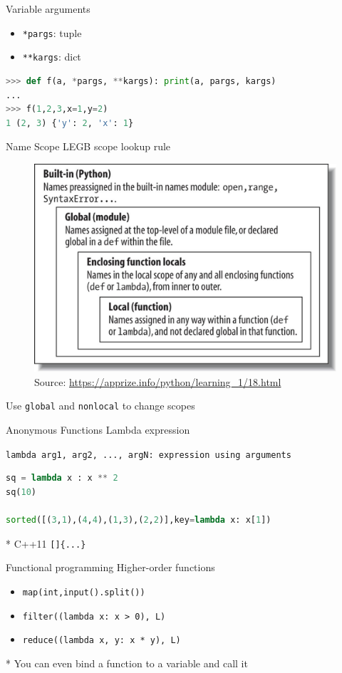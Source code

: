 \documentclass{../TexTemplate/myslide}
\begin{document}
\begin{frame}[fragile]{Variable arguments}
\begin{itemize}
	\item \verb'*pargs': tuple
	\item \verb'**kargs': dict
\end{itemize}
\begin{lstlisting}[language=python]
>>> def f(a, *pargs, **kargs): print(a, pargs, kargs)
...
>>> f(1,2,3,x=1,y=2)
1 (2, 3) {'y': 2, 'x': 1}
\end{lstlisting}
\end{frame}

\begin{frame}[fragile]{Name Scope}
LEGB scope lookup rule
\begin{figure}
\centering
\includegraphics[width=0.6\linewidth]{fig/legb.jpg}
\caption*{\scriptsize Source: \url{https://apprize.info/python/learning_1/18.html}}
\end{figure}
Use \verb'global' and \verb'nonlocal' to change scopes
\end{frame}

\begin{frame}[fragile]{Anonymous Functions}
Lambda expression
\begin{center}
\verb'lambda arg1, arg2, ..., argN: expression using arguments'
\end{center}
\begin{lstlisting}[language=python]
sq = lambda x : x ** 2
sq(10)

sorted([(3,1),(4,4),(1,3),(2,2)],key=lambda x: x[1])
\end{lstlisting}
* C++11 \verb'[]{...}'
\end{frame}

\begin{frame}[fragile]{Functional programming}
Higher-order functions
\begin{itemize}
	\item \verb'map(int,input().split())'
	\item \verb'filter((lambda x: x > 0), L)'
	\item \verb'reduce((lambda x, y: x * y), L)'
\end{itemize}
* You can even bind a function to a variable and call it
\end{frame}
\end{document}
